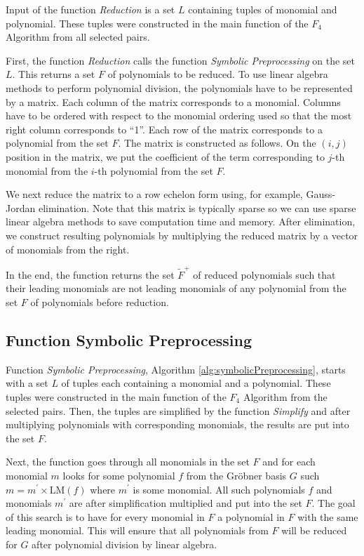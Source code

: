 Input of the function \textit{Reduction} is a set $L$ containing tuples of monomial and polynomial. These tuples were constructed in the main function of the $F_4$ Algorithm from all selected pairs.

First, the function \textit{Reduction} calls the function \textit{Symbolic Preprocessing} on the set $L$. This returns a set $F$ of polynomials to be reduced. To use linear algebra methods to perform polynomial division, the polynomials have to be represented by a matrix. Each column of the matrix corresponds to a monomial. Columns have to be ordered with respect to the monomial ordering used so that the most right column corresponds to ``1''. Each row of the matrix corresponds to a polynomial from the set $F$. The matrix is constructed as follows. On the $(i, j)$ position in the matrix, we put the coefficient of the term corresponding to $j$-th monomial from the $i$-th polynomial from the set $F$.

We next reduce the matrix to a row echelon form using, for example, Gauss-Jordan elimination. Note that this matrix is typically sparse so we can use sparse linear algebra methods to save computation time and memory. After elimination, we construct resulting polynomials by multiplying the reduced matrix by a vector of monomials from the right.

In the end, the function returns the set $\tilde{F}^+$ of reduced polynomials such that their leading monomials are not leading monomials of any polynomial from the set $F$ of polynomials before reduction.



\subsection{Function Symbolic Preprocessing}
Function \textit{Symbolic Preprocessing}, Algorithm \ref{alg:symbolicPreprocessing}, starts with a set $L$ of tuples each containing a monomial and a polynomial. These tuples were constructed in the main function of the $F_4$ Algorithm from the selected pairs. Then, the tuples are simplified by the function \textit{Simplify} and after multiplying polynomials with corresponding monomials, the results are put into the set $F$.

Next, the function goes through all monomials in the set $F$ and for each monomial $m$ looks for some polynomial $f$ from the Gr\"obner basis $G$ such $m = m^\prime \times \textrm{LM}(f)$ where $m^\prime$ is some monomial. All such polynomials $f$ and monomials $m^\prime$ are after simplification multiplied and put into the set $F$. The goal of this search is to have for every monomial in $F$ a polynomial in $F$ with the same leading monomial. This will ensure that all polynomials from $F$ will be reduced for $G$ after polynomial division by linear algebra.

